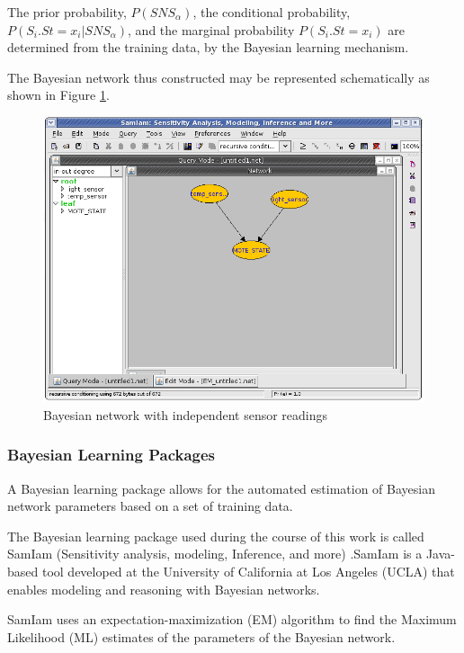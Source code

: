 \documentclass{sig-alternate-10pt}
\begin{document}
The prior probability, $P(SNS_{\alpha})$, the conditional probability, $P(S_i.St = x_i | SNS_{\alpha})$, and the marginal probability $P(S_i.St = x_i)$ are determined from the training data, by the Bayesian learning mechanism.

The Bayesian network thus constructed may be represented schematically as shown in Figure \ref{Fig1:BayesianNet}.

 \begin{figure}[h]
\centering
\includegraphics[scale=0.3]	{img/BayesianNetwork.png}
\caption{Bayesian network with independent sensor readings} 
\label{Fig1:BayesianNet}
\end{figure} 


\subsubsection{Bayesian Learning Packages} \label{subsubsec:SamIAm}

A Bayesian learning package allows for the automated estimation of Bayesian
network parameters based on a set of training data.

The Bayesian learning package used during the course of this work is called
SamIam (Sensitivity analysis, modeling, Inference, and more)
\cite{Samiam:2004}.SamIam is a Java-based tool developed at the University of
California at Los Angeles (UCLA) that enables modeling and reasoning with Bayesian
networks.

SamIam uses an expectation-maximization (EM) algorithm
\cite{EMAlgoDempster:1977} to find the Maximum
Likelihood (ML) estimates of the parameters of the Bayesian network.
\end{document}
